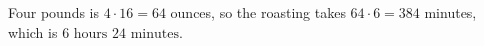 Four pounds is $4\cdot16=64$ ounces, so the roasting takes $64\cdot6=384$ minutes, which is $\boxed{6\text{ hours }24\text{ minutes}}$.
